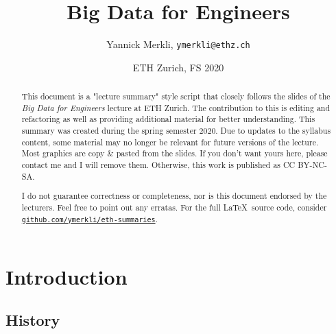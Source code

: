 \documentclass[11pt,oneside,a4paper]{article}
\title{Big Data for Engineers}
\author{Yannick Merkli, \texttt{ymerkli@ethz.ch}}
\date{ETH Zurich, FS 2020}
\begin{document}
\begin{titlepage}
\maketitle
\vspace{3cm}
\thispagestyle{empty}


\begin{abstract}
	\noindent This document is a "lecture summary" style script that closely follows the slides of the \textit{Big Data for Engineers} lecture  at ETH Zurich. The contribution to this is editing and refactoring as well as providing additional material for better understanding. This summary was created during the spring semester 2020. Due to updates to the syllabus content, some material may no longer be relevant for future versions of the lecture.\\
	Most graphics are copy \& pasted from the slides. If you don't want yours here, please contact me and I will remove them. Otherwise, this work is published as CC BY-NC-SA.
	
	\begin{center}
		\ccbyncsa
	\end{center}
	
	\noindent I do not guarantee correctness or completeness, nor is this document endorsed by the lecturers. Feel free to point out any erratas. For the full \LaTeX \ source code, consider \texttt{\href{https://github.com/ymerkli/eth-summaries}{github.com/ymerkli/eth-summaries}}.
\end{abstract}

\end{titlepage}

\maketitle
\thispagestyle{empty}
\raggedbottom
\clearpage


\clearpage
\setcounter{tocdepth}{2}
\tableofcontents
\clearpage
{}
\setlength\parindent{0pt}

\section{Introduction}

\subsection{History}
\end{document}
